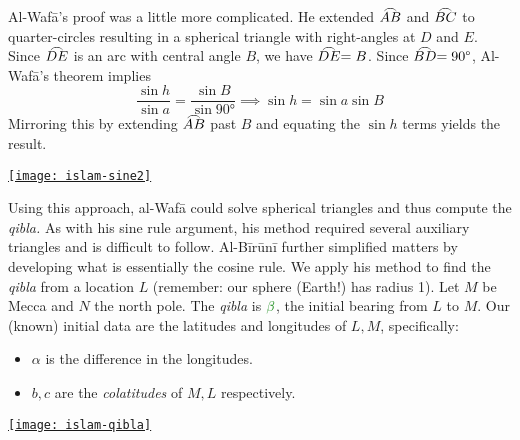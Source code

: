 \begin{minipage}[t]{0.65\linewidth}\vspace{2pt}
	Al-Wafā's proof was a little more complicated. He extended $\arc{AB}$ and $\arc{BC}$ to quarter-circles resulting in a spherical triangle with right-angles at $D$ and $E$. Since $\arc{DE}$ is an arc with central angle $B$, we have $\arc{DE}=B$. Since $\arc{BD}=\ang{90}$, Al-Wafā's theorem implies
	\[
		\frac{\sin h}{\sin a} =\frac{\sin B}{\sin \ang{90}}
		\implies \sin h=\sin a\sin B
	\]
	Mirroring this by extending $\arc{AB}$ past $B$ and equating the $\sin h$ terms yields the result.
\end{minipage}
\hfill
\begin{minipage}[t]{0.34\linewidth}\vspace{-10pt}
	\flushright
	\href{http://math.uci.edu/~ndonalds/math184/islam-sine2.html}{\texttt{[image: islam-sine2]}}
\end{minipage}
\medbreak

\begin{minipage}[t]{0.66\linewidth}\vspace{0pt}
	Using this approach, al-Wafā could solve spherical triangles and thus compute the \emph{qibla.} As with his sine rule argument, his method required several auxiliary triangles and is difficult to follow.\bigbreak
	Al-Bīrūnī further simplified matters by developing what is essentially the cosine rule. We apply his method to find the \emph{qibla} from a location $L$ (remember: our sphere (Earth!) has radius 1).\smallbreak
	Let $M$ be Mecca and $N$ the north pole. The \emph{qibla} is $\textcolor{Green}{\beta}$, the initial bearing from $L$ to $M$. Our (known) initial data are the latitudes and longitudes of $L,M$, specifically:
	\begin{itemize}\itemsep0pt
	  \item $\alpha$ is the difference in the longitudes.
	  \item $b,c$ are the \emph{colatitudes}\footnotemark{} of $M,L$ respectively. 
	\end{itemize} 
\end{minipage}
\hfill
\begin{minipage}[t]{0.32\linewidth}\vspace{0pt}
	\flushright
	\href{http://math.uci.edu/~ndonalds/math184/islam-qibla.html}{\texttt{[image: islam-qibla]}}
\end{minipage}
\medbreak


